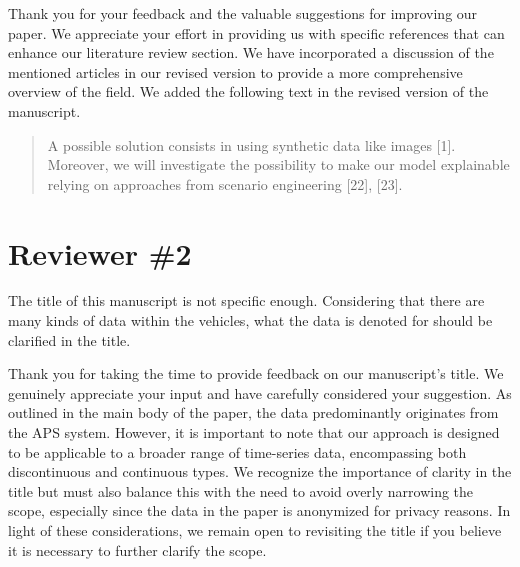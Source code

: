 \documentclass{article}
\begin{document}
\AR Thank you for your feedback and the valuable suggestions for improving our paper. We appreciate your effort in providing us with specific references that can enhance our literature review section. We have incorporated a discussion of the mentioned articles in our revised version to provide a more comprehensive overview of the field. \newline
We added the following text in the revised version of the manuscript.

\begin{quote}
A possible solution consists in using synthetic data like images [1].
    \newline\newline
    Moreover, we will investigate the possibility to
make our model explainable relying on approaches from
scenario engineering [22], [23].
\end{quote}

\newpage
\headall

\section{Reviewer \#2}

\RC The title of this manuscript is not specific enough. Considering that there are many kinds of data within the vehicles, what the data is denoted for should be clarified in the title. 

\AR Thank you for taking the time to provide feedback on our manuscript's title. We genuinely appreciate your input and have carefully considered your suggestion. As outlined in the main body of the paper, the data predominantly originates from the APS system. However, it is important to note that our approach is designed to be applicable to a broader range of time-series data, encompassing both discontinuous and continuous types. We recognize the importance of clarity in the title but must also balance this with the need to avoid overly narrowing the scope, especially since the data in the paper is anonymized for privacy reasons. 
In light of these considerations, we remain open to revisiting the title if you believe it is necessary to further clarify the scope.

\end{document}
